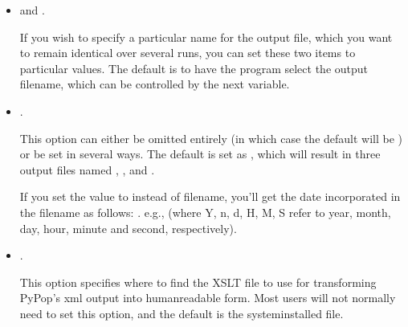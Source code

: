 \documentclass[letterpaper,10pt,english,openany,oneside]{sphinxmanual}
\begin{document}
\sphinxAtStartPar
\sphinxcode{\sphinxupquote{{[}General{]}}} 
\begin{itemize}
\item {} 
\sphinxAtStartPar
{} and .

\sphinxAtStartPar
If you wish to specify a particular name for the output file, which
you want to remain identical over several runs, you can set these
two items to particular values. The default is to have the program
select the output filename, which can be controlled by the next
variable. 

\item {} 
\sphinxAtStartPar
{}.

\sphinxAtStartPar
This option can either be omitted entirely (in which case the
default will be ) or be set in several ways. The
default is set as , which will result in three output
files named ,
, and
. \sphinxstylestrong{{[}Default:}
 \sphinxstylestrong{{]}}

\sphinxAtStartPar
If you set the value to  instead of filename, you’ll get the
date incorporated in the filename as follows:
.
e.g.,  (where Y, n,
d, H, M, S refer to year, month, day, hour, minute and second,
respectively).

\item {} 
\sphinxAtStartPar
{}.

\sphinxAtStartPar
This option specifies where to find the XSLT file to use for
transforming PyPop’s xml output into human\sphinxhyphen{}readable form. Most users
will not normally need to set this option, and the default is the
system\sphinxhyphen{}installed  file.

\end{itemize}
\end{document}
